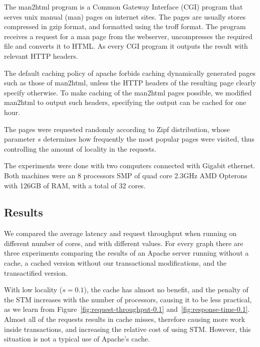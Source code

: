 \documentclass[preprint,11pt]{sigplanconf}
\begin{document}
The man2html program is a Common Gateway Interface (CGI) program that serves
unix manual (man) pages on internet sites. The pages are usually stores
compressed in gzip format, and formatted using the troff format. The program
receives a request for a man page from the webserver, uncompresses the required
file and converts it to HTML. As every CGI program it outputs the result with
relevant HTTP headers.

The default caching policy of apache forbids caching dynamically generated pages
such as those of man2html, unless the HTTP headers of the resulting page clearly
specify otherwise. To make caching of the man2html pages possible, we modified
man2html to output such headers, specifying the output can be cached for one
hour.

The pages were requested randomly according to Zipf distribution, whose
parameter $s$ determines how frequently the most popular pages were visited,
thus controlling the amount of locality in the requests.

The experiments were done with two computers connected with Gigabit ethernet.
Both machines were an 8 processors SMP of quad core 2.3GHz AMD Opterons 
with 126GB of RAM, with a total of 32 cores. 

\subsection{Results} 
We compared the average latency and request throughput when running on different
number of cores, and with different  values. For every graph there are three
experiments comparing the results of an Apache server running without a cache, a
cached version without our transactional modifications, and the transactified
version. 

With low locality ($s=0.1$), the cache has almost no benefit, and the penalty of
the STM increases with the number of processors, causing it to be less
practical, as we learn from Figure~\ref{fig:request-throughput-0.1}
and~\ref{fig:response-time-0.1}. Almost all of the requests results in cache
misses, therefore causing more work inside transactions, and increasing the
relative cost of using STM. However, this situation is not a typical use of
Apache's cache.
\end{document}
